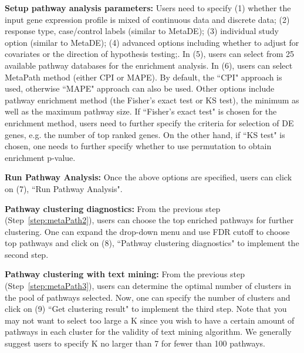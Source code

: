 \begin{steps}
\item \textbf{Setup pathway analysis parameters:}
Users need to specify {\color{red}(1) } whether the input gene expression profile is mixed of continuous data and discrete data;
{\color{red}(2)} response type, case/control labels (similar to MetaDE);
{\color{red}(3)} individual study option (similar to MetaDE);
{\color{red}(4)} advanced options including whether to adjust for covariates or the direction of hypothesis testing;.
In {\color{red}(5)}, users can select from 25 available pathway databases for the enrichment analysis.
In {\color{red}(6)}, users can select MetaPath method (either CPI or MAPE).
By default, the ``CPI" approach is used, otherwise ``MAPE" approach can also be used. Other options include pathway enrichment method (the Fisher's exact test or KS test), the minimum as well as the maximum pathway size. If ``Fisher's exact test" is chosen for the enrichment method, users need to further specify the criteria for selection of DE genes, e.g. the number of top ranked genes. On the other hand, if ``KS test" is chosen, one needs to further specify whether to use permutation to obtain enrichment p-value. 

\item \textbf{Run Pathway Analysis:}
\label{step:metaPath1}
Once the above options are specified, users can click on {\color{red}(7)}, ``Run Pathway Analysis".

\textbf{Pathway clustering diagnostics:} 
\label{step:metaPath2}
From the previous step (Step~\ref{step:metaPath2}), users can choose the top enriched pathways for further clustering. 
One can expand the drop-down menu and use FDR cutoff to choose top pathways and click on {\color{red}(8)}, ``Pathway clustering diagnostics" to implement the second step.

\textbf{Pathway clustering with text mining:} 
\label{step:metaPath3}
From the previous step (Step~\ref{step:metaPath3}), users can determine the optimal number of clusters in the pool of pathways selected. 
Now, one can specify the number of clusters and click on {\color{red}(9)} ``Get clustering result" to implement the third step. 
Note that you may not want to select too large a K since you wish to have a certain amount of pathways in each cluster for the validity of text mining algorithm. 
We generally suggest users to specify K no larger than 7 for fewer than 100 pathways. 
\end{steps}





